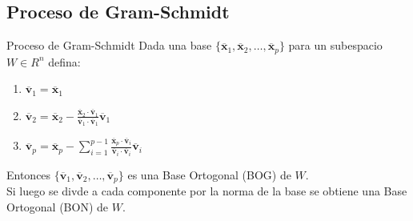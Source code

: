 \documentclass[a4paper, twoside]{article}
\numberwithin{equation}{section}
\numberwithin{figure}{section}
\numberwithin{table}{section}
\newcommand{\vect}[1]{\overline{\textbf{#1}}}
\begin{document}
\subsection{Proceso de Gram-Schmidt}
\begin{definicion*}{Proceso de Gram-Schmidt}
	Dada una base $\{\vect{x}_1,\vect{x}_2,\ldots,\vect{x}_p\}$ para un subespacio $W \in R^n$ defina:
	\begin{enumerate}
		\item $\vect{v}_1 = \vect{x}_1$
		\item $\vect{v}_2 = \vect{x}_2 - \frac{\vect{x}_2 \cdot \vect{v}_1}{\vect{v}_1 \cdot \vect{v}_1} \vect{v}_1$
		\item $\vect{v}_p = \vect{x}_p - \sum_{i=1}^{p-1} \frac{\vect{x}_p \cdot \vect{v}_i}{\vect{v}_i \cdot \vect{v}_i} \vect{v}_i$
	\end{enumerate}
	Entonces $\{ \vect{v}_1,\vect{v}_2,\ldots,\vect{v}_p \}$ es una Base Ortogonal (BOG) de $W$.\\
			
	Si luego se divde a cada componente por la norma de la base se obtiene una Base Ortogonal (BON) de $W$.
\end{definicion*}
\end{document}
